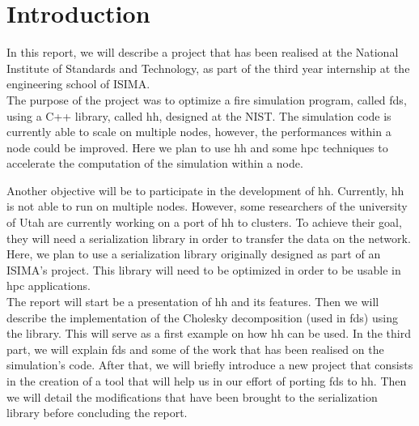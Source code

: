 
\setcounter{page}{1}
\clearpage{}
\pagestyle{fancy}
\section*{Introduction}

In this report, we will describe a project that has been realised at the
National Institute of Standards and Technology, as part of the third year
internship at the engineering school of ISIMA.\\

The purpose of the project was to optimize a fire simulation program, called
\gls{fds}, using a C++ library, called \gls{hh}, designed at the NIST. The
simulation code is currently able to scale on multiple nodes, however, the
performances within a node could be improved. Here we plan to use \gls{hh}
and some \gls{hpc} techniques to accelerate the computation of the simulation
within a node.

Another objective will be to participate in the development of \gls{hh}.
Currently, \gls{hh} is not able to run on multiple nodes. However, some
researchers of the university of Utah are currently working on a port of
\gls{hh} to clusters. To achieve their goal, they will need a serialization
library in order to transfer the data on the network. Here, we plan to use a
serialization library originally designed as part of an ISIMA's project. This
library will need to be optimized in order to be usable in \gls{hpc}
applications.\\

The report will start be a presentation of \gls{hh} and its features. Then we
will describe the implementation of the Cholesky decomposition (used in
\gls{fds}) using the library. This will serve as a first example on how \gls{hh}
can be used. In the third part, we will explain \gls{fds} and some of the work
that has been realised on the simulation's code. After that, we will briefly
introduce a new project that consists in the creation of a tool that will help
us in our effort of porting \gls{fds} to \gls{hh}. Then we will detail the
modifications that have been brought to the serialization library before
concluding the report.

\clearpage{}
